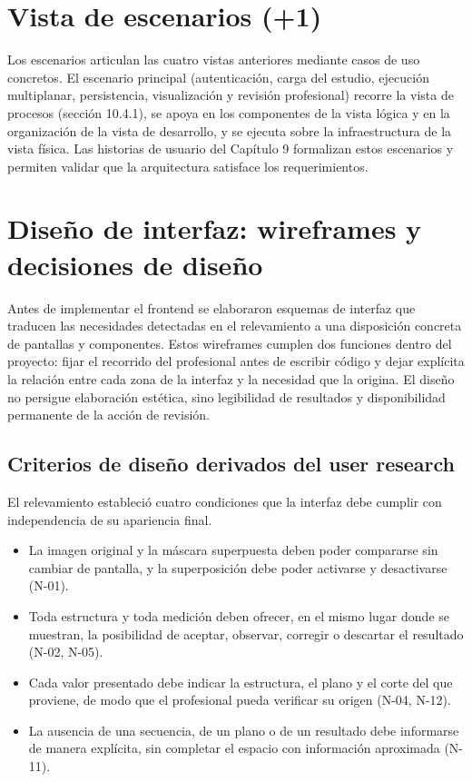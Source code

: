 \section{Vista de escenarios (+1)}

Los escenarios articulan las cuatro vistas anteriores mediante casos de uso concretos. El escenario principal (autenticación, carga del estudio, ejecución multiplanar, persistencia, visualización y revisión profesional) recorre la vista de procesos (sección 10.4.1), se apoya en los componentes de la vista lógica y en la organización de la vista de desarrollo, y se ejecuta sobre la infraestructura de la vista física. Las historias de usuario del Capítulo 9 formalizan estos escenarios y permiten validar que la arquitectura satisface los requerimientos.

\section{Diseño de interfaz: wireframes y decisiones de diseño}

Antes de implementar el frontend se elaboraron esquemas de interfaz que traducen las necesidades detectadas en el relevamiento a una disposición concreta de pantallas y componentes. Estos wireframes cumplen dos funciones dentro del proyecto: fijar el recorrido del profesional antes de escribir código y dejar explícita la relación entre cada zona de la interfaz y la necesidad que la origina. El diseño no persigue elaboración estética, sino legibilidad de resultados y disponibilidad permanente de la acción de revisión.

\subsection{Criterios de diseño derivados del user research}

El relevamiento estableció cuatro condiciones que la interfaz debe cumplir con independencia de su apariencia final.

\begin{itemize}
  \item La imagen original y la máscara superpuesta deben poder compararse sin cambiar de pantalla, y la superposición debe poder activarse y desactivarse (N-01).
  \item Toda estructura y toda medición deben ofrecer, en el mismo lugar donde se muestran, la posibilidad de aceptar, observar, corregir o descartar el resultado (N-02, N-05).
  \item Cada valor presentado debe indicar la estructura, el plano y el corte del que proviene, de modo que el profesional pueda verificar su origen (N-04, N-12).
  \item La ausencia de una secuencia, de un plano o de un resultado debe informarse de manera explícita, sin completar el espacio con información aproximada (N-11).
\end{itemize}

